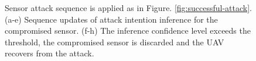 \documentclass[letterpaper, 10 pt, conference]{ieeeconf}  %
\begin{document}
\begin{figure}[]
	\centering
	\vspace{-5pt}
	\caption{Sensor attack sequence is applied as in Figure. \ref{fig:successful-attack}. (a-e) Sequence updates of attack intention inference for the compromised sensor. (f-h) The inference confidence level exceeds the threshold, the compromised sensor is discarded and the UAV recovers from the attack.}
	\label{fig:recovered-attack}
\end{figure}
\end{document}

